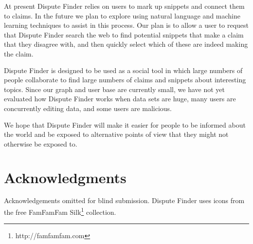 \documentclass{www2010-submission}
\newcommand{\todo}[1]{}
\begin{document}
At present Dispute Finder relies on users to mark up snippets and connect them to claims. In the future we plan to explore using natural language and machine learning techniques to assist in this process. Our plan is to allow a user to request that Dispute Finder search the web to find potential snippets that make a claim that they disagree with, and then quickly select which of these are indeed making the claim.

Dispute Finder is designed to be used as a social tool in which large numbers of people collaborate to find large numbers of claims and snippets about interesting topics. Since our graph and user base are currently small, we have not yet evaluated how Dispute Finder works when data sets are huge, many users are concurrently editing data, and some users are malicious.

We hope that Dispute Finder will make it easier for people to be informed about the world and be exposed to alternative points of view that they might not otherwise be exposed to.

\section{Acknowledgments}

Acknowledgements omitted for blind submission. Dispute Finder uses icons from the free FamFamFam Silk\footnote{http://famfamfam.com} collection.


\todo{Sort out bad references}

\end{document}
